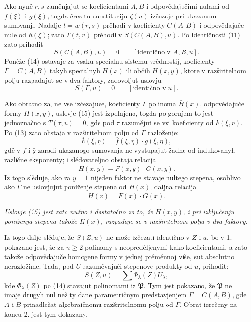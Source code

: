 \documentclass[11pt]{article}
\begin{document}
Ako nyně $r,s$ zaměnjajut se koeficientami $A,B$ i odpovědajučimi nulami od $f(\xi)$ i $g(\xi)$, togda črez tu substituciju $\zeta(u)$ izčezaje pri ukazanom sumovanji. Nadalje $t=w(r,s)$ prěhodi v koeficienty $C(A,B)$ i odpovědajuče nule od $h(\xi)$; zato $T(t,u)$ prěhodi v $S(C(A,B),u)$. Po identičnosti (11) zato prihodit
\begin{equation}
 S(C(A,B),u)=0\qquad[\text{identično v }A,B,u].
\tag{14}
\end{equation}
Poněže (14) ostavaje za vsaku specialnu sistemu vrědnostij, koeficienty $\Gamma=C(A,B)$ takyh specialnyh $H(x)$ ili občih $H(x,y)$, ktore v razširitelnom polju razpadajut se v dva faktory, zadovoljut uslovju
\begin{equation}
 S(\Gamma,u)=0\qquad[\text{identično v }u].
\tag{15}
\end{equation}

Ako obratno za, ne vse izčezajuče, koeficienty $\Gamma$ polinoma $\bar H(x)$, odpovědajuče formy $\bar H(x,y)$, uslovje (15) jest izpolnjeno, togda po gornjem to jest jednoznačno s $T(\tau,u)=0$, gde pod $\tau$ razumějut se vsi koeficienty od $\bar h(\xi,\eta)$. Po (13) zato obstaja v razširitelnom polju od $\Gamma$ razloženje:
\[
 \bar h(\xi,\eta)=\bar f(\xi,\eta)\cdot\bar g(\xi,\eta),
\]
gdě v $\bar f$ i $\bar g$ zaradi ukazanogo sumovanja ne vystupajut žadne od indukovanyh različne eksponenty; i slědovateljno obstaja relacija
\[
 \bar H(x,y)=\bar F(x,y)\cdot\bar G(x,y).
\]
Iz togo slěduje, ako za $y=1$ nijeden faktor ne stavaje nultego stepena, osoblivo ako $\Gamma$ ne uslovjujut poniženje stepena od $H(x)$, daljna relacija
\[
 \bar H(x)=\bar F(x)\cdot\bar G(x).
\]

\emph{Uslovje (15) jest zato nužno i dostatočno za to, že $\bar H(x,y)$, i pri izključenju poniženja stepena takože $\bar H(x)$, razpadaje se v razširitelnom polju v dva faktory.}

Iz togo dalje slěduje, že $S(Z,u)$ ne može izčezati identično v $Z$ i $u$, bo v 1. pokazano jest, že za $n\ge2$ polinomy s neopreděljenymi kako koeficientami, a zato takože odpovědajuče homogene formy v jednej prěměnnoj više, sut absolutno nerazložime. Tada, pod $U$ razuměvajuči stepenove produkty od $u$, prihodit:
\[
 S(Z,u)=\sum \Phi_\lambda(Z)U_\lambda,
\]
kde $\Phi_\lambda(Z)$ po (14) stavajut polinomami iz $\mathfrak P$. Tym jest pokazano, že $\mathfrak P$ ne imaje drugyh nul než ty dane parametričnym predstavjenjem $\Gamma=C(A,B)$, gde $A$ i $B$ prinadležat algebraičnomu razširitelnomu polju od $\Gamma$. Obrat izrečeny na koncu 2. jest tym dokazany.
\end{document}
